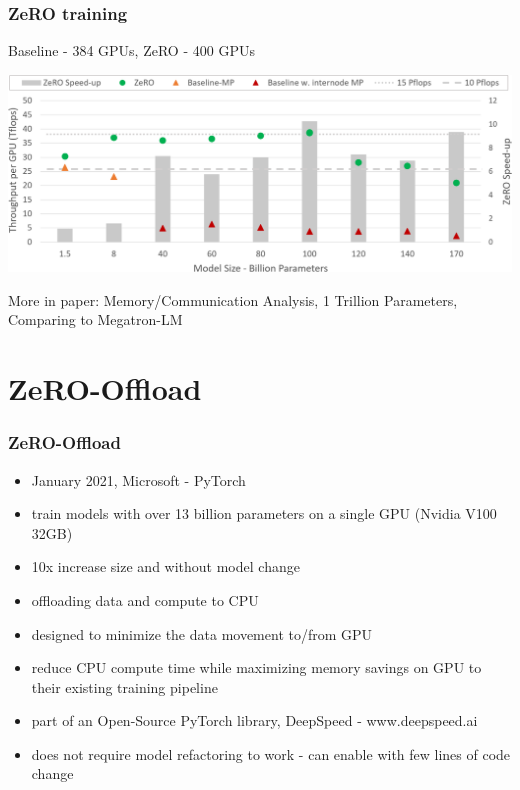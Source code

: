 \documentclass{beamer}
\begin{document}
\begin{frame}
    \frametitle{ZeRO training}
    \tiny{Baseline - 384 GPUs, ZeRO - 400 GPUs}
    \begin{center}
        \includegraphics[scale=1.25]{img/zero_model_training_flops.png}
    \end{center}
    \tiny{More in paper: Memory/Communication Analysis, 1 Trillion Parameters, Comparing to Megatron-LM}
\end{frame}


\section{ZeRO-Offload}
\begin{frame}
    \frametitle{ZeRO-Offload \cite{zero_offload}}
    \begin{itemize}
        \item January 2021, Microsoft - PyTorch
        \item train models with over 13 billion parameters on a single GPU (Nvidia V100 32GB)
        \item 10x increase size and without model change
        \item offloading data and compute to CPU
        \item designed to minimize the data movement to/from GPU
        \item reduce CPU compute time while maximizing memory savings on GPU
to their existing training pipeline
        \item part of an Open-Source PyTorch library, DeepSpeed - www.deepspeed.ai
        \item does not require model refactoring to work - can enable with few lines of code change
    \end{itemize}
\end{frame}
\end{document}
